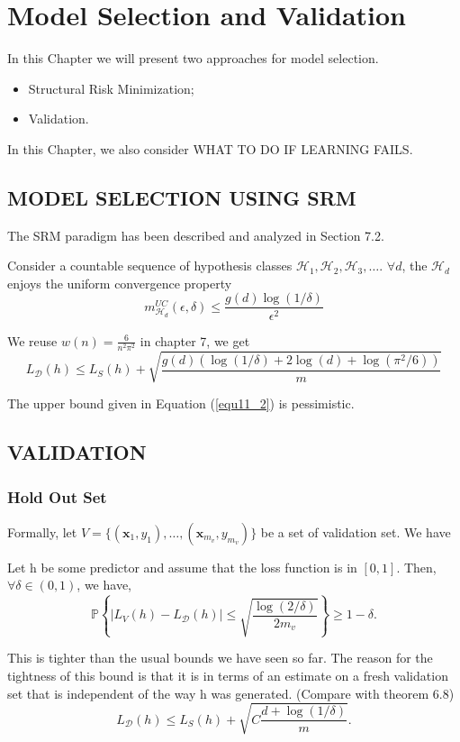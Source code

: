 
\section{Model Selection and Validation}

In this Chapter we will present two approaches for model selection.
\begin{itemize}
	\item Structural Risk Minimization;
	\item Validation.
\end{itemize}

{In this Chapter, we also consider WHAT TO DO IF LEARNING FAILS.}

\subsection{MODEL SELECTION USING SRM}

The SRM paradigm has been described and analyzed in Section 7.2.

Consider a countable sequence of hypothesis classes $\mathcal{H}_1, \mathcal{H}_2, \mathcal{H}_3, \dots$.
$\forall d$, the $\mathcal{H}_d$ enjoys the uniform convergence property
\begin{equation}
	m^{UC}_{\mathcal{H}_d}(\epsilon, \delta) \le 
	\frac{g(d)\log(1/\delta)}{\epsilon^2}
\end{equation}

We reuse $w(n) = \frac{6}{n^2 \pi^2}$ in chapter 7, we get
\begin{equation}
	\label{equ11_2}
	L_\mathcal{D} (h) \le L_S(h) + \sqrt{\frac{g(d)( \log(1/\delta) + 2\log(d) + \log(\pi^2/6) )}{m} }
\end{equation}

The upper bound given in Equation (\ref{equ11_2}) is pessimistic.

\subsection{VALIDATION}

\subsubsection{Hold Out Set}

Formally, let $V = \{ (\mathbf{x}_1, y_1), \dots, (\mathbf{x}_{m_v}, y_{m_v}) \} $ be a set of validation set.
We have
\begin{thm}
	\label{thm11_1}
	Let h be some predictor and assume that the loss function is in $[0,1]$. Then, $\forall \delta \in (0, 1)$,
	we have,
	\[ \mathbb{P} \left\{ | L_V(h)-L_\mathcal{D}(h) | \le \sqrt{ \frac{\log(2/\delta)}{2m_v} } \right\} \ge 1- \delta.\]
\end{thm}
This is tighter than the usual bounds we have seen so far. The reason for the tightness of this bound is that
it is in terms of an estimate on a fresh validation set that is independent of the way h was generated. (Compare with theorem 6.8)
\[ L_\mathcal {D} (h) \le L_S (h) + \sqrt {C \frac{d+\log(1/\delta)}{m}}.\]

